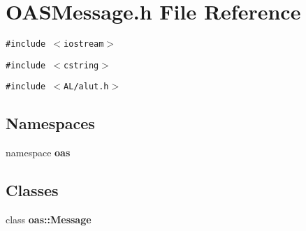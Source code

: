\section{OASMessage.h File Reference}
\label{OASMessage_8h}
{\tt \#include $<$iostream$>$}\par
{\tt \#include $<$cstring$>$}\par
{\tt \#include $<$AL/alut.h$>$}\par
\subsection*{Namespaces}
\begin{CompactItemize}
\item 
namespace \textbf{oas}
\end{CompactItemize}
\subsection*{Classes}
\begin{CompactItemize}
\item 
class \textbf{oas::Message}
\end{CompactItemize}
